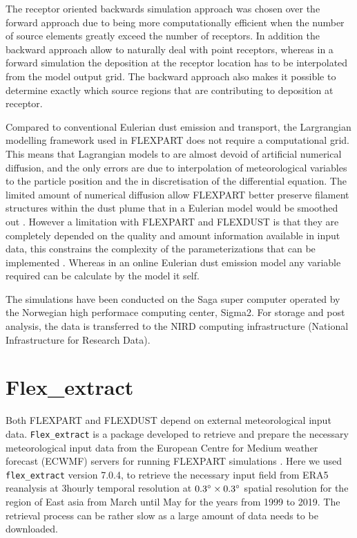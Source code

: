 The receptor oriented backwards simulation approach was chosen over the forward approach due to being more computationally efficient when the number of source elements greatly exceed the number of receptors. In addition the backward approach allow to naturally deal with point receptors, whereas in a forward simulation the deposition at the receptor location has to be interpolated from the model output grid. The backward approach also makes it possible to determine exactly which source regions that are contributing to deposition at receptor.     

Compared to conventional Eulerian dust emission and transport, the Largrangian modelling framework used in FLEXPART does not require a computational grid. This means that Lagrangian models to are almost devoid of artificial numerical diffusion, and the only errors are due to interpolation of meteorological variables to the particle position and the in discretisation of the differential equation. The limited amount of numerical diffusion allow FLEXPART better preserve filament structures within the dust plume that in a Eulerian model would be smoothed out \parencite{cassiani_offline_2016}. However a limitation with FLEXPART and FLEXDUST is that they are completely depended on the quality and amount information available in input data, this constrains the complexity of the parameterizations that can be implemented \parencite{flexpart_wetdep}. Whereas in an online Eulerian dust emission model any variable required can be calculate by the model it self.       

The simulations have been conducted on the Saga super computer operated by the Norwegian high performace 
computing center, Sigma2. For storage and post analysis, the data is transferred to the 
NIRD computing infrastructure (National Infrastructure for Research Data). 


\section{Flex\_extract}
Both FLEXPART and FLEXDUST depend on external meteorological input data. \verb|Flex_extract| is a package developed to retrieve and prepare the necessary meteorological input data from the European Centre for Medium weather forecast (ECWMF) servers for running FLEXPART simulations \parencite{tipka_flex_extract_2020}. Here we used \verb|flex_extract| version 7.0.4, to retrieve the necessary input field from ERA5 reanalysis at 3hourly temporal resolution at $0.3\degree \times 0.3\degree$ spatial resolution for the region of East asia from March until May for the years from 1999 to 2019. The retrieval process can be rather slow as a large amount of data needs to be downloaded.     

